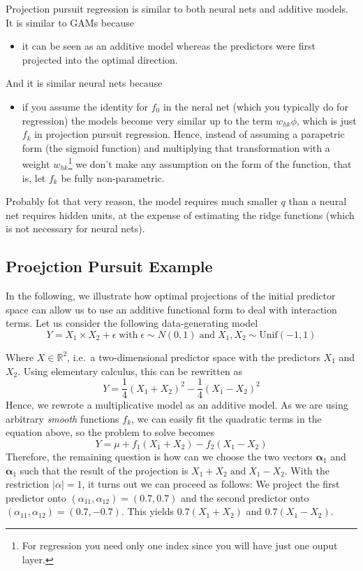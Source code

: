 \documentclass[]{book}
\providecommand{\tightlist}{%
  \setlength{\itemsep}{0pt}\setlength{\parskip}{0pt}}
\let\rmarkdownfootnote\footnote%
\def\footnote{\protect\rmarkdownfootnote}
\begin{document}
Projection pursuit regression is similar to both neural nets and
additive models. It is similar to GAMs because

\begin{itemize}
\tightlist
\item
  it can be seen as an additive model whereas the predictors were first
  projected into the optimal direction.
\end{itemize}

And it is similar neural nets because

\begin{itemize}
\tightlist
\item
  if you assume the identity for \(f_0\) in the neral net (which you
  typically do for regression) the models become very similar up to the
  term \(w_{hk} \phi\), which is just \(f_k\) in projection pursuit
  regression. Hence, instead of assuming a parapetric form (the sigmoid
  function) and multiplying that transformation with a weight
  \(w_{hk}\)\footnote{For regression you need only one index since you
    will have just one ouput layer.} we don't make any assumption on the
  form of the function, that is, let \(f_k\) be fully non-parametric.
\end{itemize}

Probably fot that very reason, the model requires much smaller \(q\)
than a neural net requires hidden units, at the expense of estimating
the ridge functions (which is not necessary for neural nets).

\subsection{Proejction Pursuit
Example}\label{proejction-pursuit-example}

In the following, we illustrate how optimal projections of the initial
predictor space can allow us to use an additive functional form to deal
with interaction terms. Let us consider the following data-generating
model
\[ Y = X_1 \times X_2 + \epsilon \; \text{with} \;\epsilon \sim N(0, 1) \; \text{and}\; X_1, X_2 \sim \text{Unif}(-1,1)\]

Where \(X \in \mathbb{R}^2\), i.e.~a two-dimensional predictor space
with the predictors \(X_1\) and \(X_2\). Using elementary calculus, this
can be rewritten as
\[ Y = \frac{1}{4} (X_1 + X_2)^2  - \frac{1}{4}(X_1 - X_2)^2\] Hence, we
rewrote a multiplicative model as an additive model. As we are using
arbitrary \emph{smooth} functions \(f_k\), we can easily fit the
quadratic terms in the equation above, so the problem to solve becomes
\[Y = \mu + f_1(X_1 + X_2) - f_2(X_1 - X_2)\] Therefore, the remaining
question is how can we choose the two vectors \(\mathbf{\alpha}_1\) and
\(\mathbf{\alpha}_1\) such that the result of the projection is
\(X_1 + X_2 \;\text{and}\;X_1 - X_2\). With the restriction
\(|\alpha| = 1\), it turns out we can proceed as follows: We project the
first predictor onto \((\alpha_{11}, \alpha_{12}) = (0.7, 0.7)\) and the
second predictor onto \((\alpha_{11}, \alpha_{12}) = (0.7, -0.7)\). This
yields \(0.7(X_1 + X_2)\) and \(0.7(X_1 - X_2)\).
\end{document}
